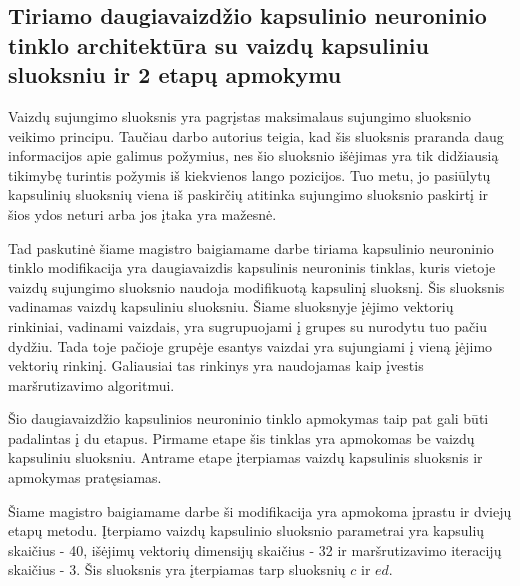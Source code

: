 \subsection{Tiriamo daugiavaizdžio kapsulinio neuroninio tinklo architektūra su vaizdų kapsuliniu sluoksniu ir 2 etapų apmokymu}

Vaizdų sujungimo sluoksnis yra pagrįstas maksimalaus sujungimo sluoksnio veikimo principu. Taučiau darbo \cite{capsNet} autorius teigia, kad šis sluoksnis praranda daug informacijos apie galimus požymius, nes šio sluoksnio išėjimas yra tik didžiausią tikimybę turintis požymis iš kiekvienos lango pozicijos. Tuo metu, jo pasiūlytų kapsulinių sluoksnių viena iš paskirčių atitinka sujungimo sluoksnio paskirtį ir šios ydos neturi arba jos įtaka yra mažesnė.

Tad paskutinė šiame magistro baigiamame darbe tiriama kapsulinio neuroninio tinklo modifikacija yra daugiavaizdis kapsulinis neuroninis tinklas, kuris vietoje vaizdų sujungimo sluoksnio naudoja modifikuotą kapsulinį sluoksnį. Šis sluoksnis vadinamas vaizdų kapsuliniu sluoksniu. Šiame sluoksnyje įėjimo vektorių rinkiniai, vadinami vaizdais, yra sugrupuojami į grupes su nurodytu tuo pačiu dydžiu. Tada toje pačioje grupėje esantys vaizdai yra sujungiami į vieną įėjimo vektorių rinkinį. Galiausiai tas rinkinys yra naudojamas kaip įvestis maršrutizavimo algoritmui.

Šio daugiavaizdžio kapsulinios neuroninio tinklo apmokymas taip pat gali būti padalintas į du etapus. Pirmame etape šis tinklas yra apmokomas be vaizdų kapsuliniu sluoksniu. Antrame etape įterpiamas vaizdų kapsulinis sluoksnis ir apmokymas pratęsiamas.

Šiame magistro baigiamame darbe ši modifikacija yra apmokoma įprastu ir dviejų etapų metodu. Įterpiamo vaizdų kapsulinio sluoksnio parametrai yra kapsulių skaičius - 40, išėjimų vektorių dimensijų skaičius - 32 ir maršrutizavimo iteracijų skaičius - 3. Šis sluoksnis yra įterpiamas tarp sluoksnių $c$ ir $ed$.

